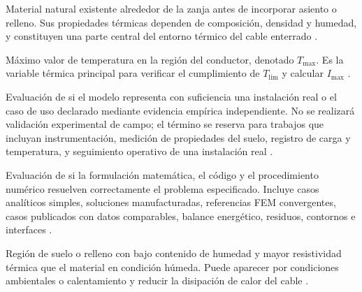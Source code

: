\documentclass[11pt,a4paper,oneside]{report}
\newcommand{\tesisbodyfont}{\fontsize{11}{13.6}\selectfont}
\newcommand{\Tmax}{T_{\max}}
\newcommand{\Imax}{I_{\max}}
\begin{document}
\begin{description}[style=nextline,itemsep=0.5\baselineskip,parsep=0pt,topsep=0.25\baselineskip]
  \item[Suelo nativo.] Material natural existente alrededor de la zanja antes de incorporar asiento o relleno. Sus propiedades térmicas dependen de composición, densidad y humedad, y constituyen una parte central del entorno térmico del cable enterrado \parencites{farouki1981thermal,devries1966thermal}[1,6--9]{khumalo2025}[secciones 4--6]{ieee442}.

  \item[Temperatura máxima del conductor.] Máximo valor de temperatura en la región del conductor, denotado $\Tmax$. Es la variable térmica principal para verificar el cumplimiento de $T_{\mathrm{lim}}$ y calcular $\Imax$ \parencites[752--760]{neher1957}{anders2005}[cláusulas 4--5]{iec60287}[3--6]{enescu2021}.

  \item[Validación.] Evaluación de si el modelo representa con suficiencia una instalación real o el caso de uso declarado mediante evidencia empírica independiente. No se realizará validación experimental de campo; el término se reserva para trabajos que incluyan instrumentación, medición de propiedades del suelo, registro de carga y temperatura, y seguimiento operativo de una instalación real \parencites{cigre2022}[93--99]{cigre2025}[350--351]{gregor2013}.

  \item[Verificación.] Evaluación de si la formulación matemática, el código y el procedimiento numérico resuelven correctamente el problema especificado. Incluye casos analíticos simples, soluciones manufacturadas, referencias FEM convergentes, casos publicados con datos comparables, balance energético, residuos, contornos e interfaces \parencites{cigre2022}[3--4,93--99]{cigre2025}[350--351]{gregor2013}.

  \item[Zona seca.] Región de suelo o relleno con bajo contenido de humedad y mayor resistividad térmica que el material en condición húmeda. Puede aparecer por condiciones ambientales o calentamiento y reducir la disipación de calor del cable \parencites[4--6]{enescu2021}[1,6--9]{khumalo2025}[14851--14852]{fariz2026}.
\end{description}
\endgroup

\begin{singlespace}
\tesisbodyfont
\printbibliography[heading=subbibnumbered,title={REFERENCIAS}]
\end{singlespace}
\end{document}

